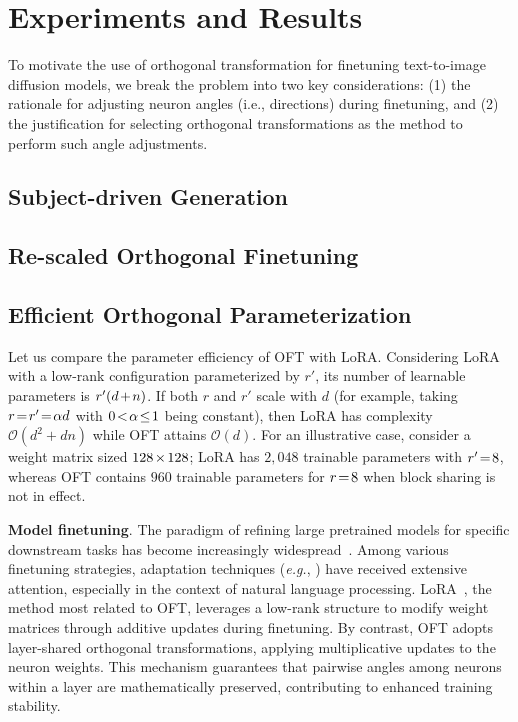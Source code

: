 \section{Experiments and Results}

To motivate the use of orthogonal transformation for finetuning text-to-image diffusion models, we break the problem into two key considerations: (1) the rationale for adjusting neuron angles (i.e., directions) during finetuning, and (2) the justification for selecting orthogonal transformations as the method to perform such angle adjustments.

\subsection{Subject-driven Generation}

\subsection{Re-scaled Orthogonal Finetuning}

\subsection{Efficient Orthogonal Parameterization}\label{sect:eff_ortho}

Let us compare the parameter efficiency of OFT with LoRA. Considering LoRA with a low-rank configuration parameterized by $r'$, its number of learnable parameters is $\thickmuskip=2mu \medmuskip=2mu r'(d+n)$. If both $r$ and $r'$ scale with $d$ (for example, taking $\thickmuskip=2mu \medmuskip=2mu r=r'=\alpha d$ with $\thickmuskip=2mu \medmuskip=2mu 0<\alpha\leq 1$ being constant), then LoRA has complexity $\mathcal{O}(d^2+dn)$ while OFT attains $\mathcal{O}(d)$. For an illustrative case, consider a weight matrix sized $\thickmuskip=2mu \medmuskip=2mu 128\times 128$; LoRA has $2,048$ trainable parameters with $\thickmuskip=2mu \medmuskip=2mu r'=8$, whereas OFT contains $960$ trainable parameters for $\thickmuskip=2mu \medmuskip=2mu r=8$ when block sharing is not in effect.

\textbf{Model finetuning}. The paradigm of refining large pretrained models for specific downstream tasks has become increasingly widespread~\cite{devlin2018bert,brown2020language,he2022masked}. Among various finetuning strategies, adaptation techniques (\emph{e.g.}, \cite{hulora2022,houlsby2019parameter,pfeiffer2020adapterfusion}) have received extensive attention, especially in the context of natural language processing. LoRA~\cite{hulora2022}, the method most related to OFT, leverages a low-rank structure to modify weight matrices through additive updates during finetuning. By contrast, OFT adopts layer-shared orthogonal transformations, applying multiplicative updates to the neuron weights. This mechanism guarantees that pairwise angles among neurons within a layer are mathematically preserved, contributing to enhanced training stability.

